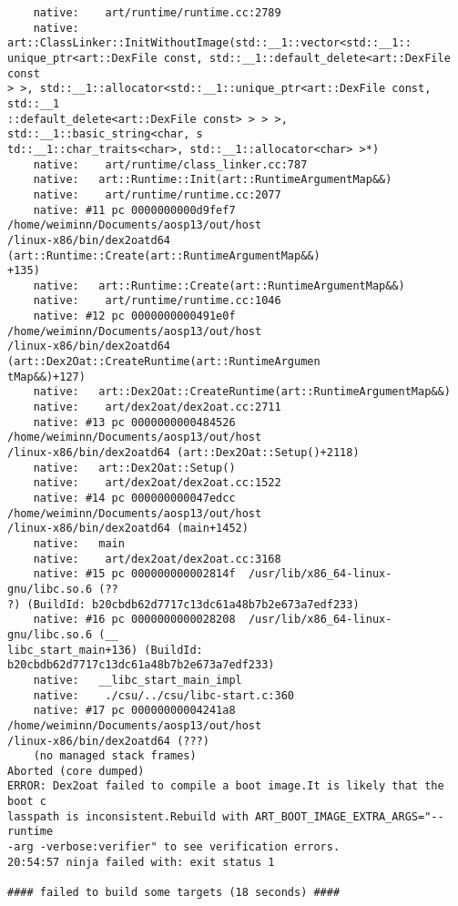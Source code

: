 \begin{lstlisting}
    native:    art/runtime/runtime.cc:2789
    native:   art::ClassLinker::InitWithoutImage(std::__1::vector<std::__1::
unique_ptr<art::DexFile const, std::__1::default_delete<art::DexFile const
> >, std::__1::allocator<std::__1::unique_ptr<art::DexFile const, std::__1
::default_delete<art::DexFile const> > > >, std::__1::basic_string<char, s
td::__1::char_traits<char>, std::__1::allocator<char> >*)
    native:    art/runtime/class_linker.cc:787
    native:   art::Runtime::Init(art::RuntimeArgumentMap&&)
    native:    art/runtime/runtime.cc:2077
    native: #11 pc 0000000000d9fef7  /home/weiminn/Documents/aosp13/out/host
/linux-x86/bin/dex2oatd64 (art::Runtime::Create(art::RuntimeArgumentMap&&)
+135)
    native:   art::Runtime::Create(art::RuntimeArgumentMap&&)
    native:    art/runtime/runtime.cc:1046
    native: #12 pc 0000000000491e0f  /home/weiminn/Documents/aosp13/out/host
/linux-x86/bin/dex2oatd64 (art::Dex2Oat::CreateRuntime(art::RuntimeArgumen
tMap&&)+127)
    native:   art::Dex2Oat::CreateRuntime(art::RuntimeArgumentMap&&)
    native:    art/dex2oat/dex2oat.cc:2711
    native: #13 pc 0000000000484526  /home/weiminn/Documents/aosp13/out/host
/linux-x86/bin/dex2oatd64 (art::Dex2Oat::Setup()+2118)
    native:   art::Dex2Oat::Setup()
    native:    art/dex2oat/dex2oat.cc:1522
    native: #14 pc 000000000047edcc  /home/weiminn/Documents/aosp13/out/host
/linux-x86/bin/dex2oatd64 (main+1452)
    native:   main
    native:    art/dex2oat/dex2oat.cc:3168
    native: #15 pc 000000000002814f  /usr/lib/x86_64-linux-gnu/libc.so.6 (??
?) (BuildId: b20cbdb62d7717c13dc61a48b7b2e673a7edf233)
    native: #16 pc 0000000000028208  /usr/lib/x86_64-linux-gnu/libc.so.6 (__
libc_start_main+136) (BuildId: b20cbdb62d7717c13dc61a48b7b2e673a7edf233)
    native:   __libc_start_main_impl
    native:    ./csu/../csu/libc-start.c:360
    native: #17 pc 00000000004241a8  /home/weiminn/Documents/aosp13/out/host
/linux-x86/bin/dex2oatd64 (???)
    (no managed stack frames)
Aborted (core dumped)
ERROR: Dex2oat failed to compile a boot image.It is likely that the boot c
lasspath is inconsistent.Rebuild with ART_BOOT_IMAGE_EXTRA_ARGS="--runtime
-arg -verbose:verifier" to see verification errors.
20:54:57 ninja failed with: exit status 1

#### failed to build some targets (18 seconds) ####
\end{lstlisting}


